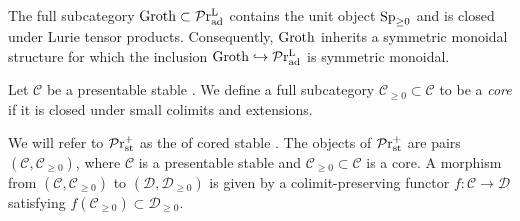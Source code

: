 \documentclass[a4paper,10pt, oneside]{amsart}
\begin{document}
	\begin{thm}
		The full subcategory $\mathrm{Groth}\subset \mathcal{P}\mathrm{r}_{\mathrm{ad}}^\mathrm{L}$ contains the unit object $\mathrm{Sp}_{\geq0}$ and is closed under Lurie tensor products. Consequently, $\mathrm{Groth}$ inherits a symmetric monoidal structure for which the inclusion $\mathrm{Groth} \hookrightarrow \mathcal{P}\mathrm{r}_{\mathrm{ad}}^\mathrm{L}$ is symmetric monoidal.
	\end{thm}
	
	\begin{de}
		Let $\mathcal{C}$ be a presentable stable \infcat. We define a full subcategory $\mathcal{C}_{\geq 0} \subset \mathcal{C}$ to be a \emph{core} if it is closed under small colimits and extensions. 
		
		We will refer to $\mathcal{P}\mathrm{r}^{+}_{\mathrm{st}}$ as the \infcat of cored stable \infcats. The objects of $\mathcal{P}\mathrm{r}^{+}_{\mathrm{st}}$ are pairs $(\mathcal{C}, \mathcal{C}_{ \geq 0})$, where $\mathcal{C}$ is a presentable stable \infcat and $\mathcal{C}_{\geq 0} \subset \mathcal{C}$ is a core. A morphism from $(\mathcal{C}, \mathcal{C}_{ \geq 0})$ to $(\mathcal{D}, \mathcal{D}_{ \geq 0})$ is given by a colimit-preserving functor $f: \mathcal{C} \rightarrow \mathcal{D}$ satisfying $f\left(\mathcal{C}_{\geq 0}\right) \subset \mathcal{D}_{\geq 0}$.
	\end{de}
	
\end{document}
